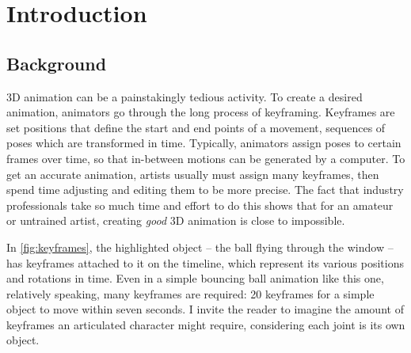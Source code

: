 \chapter{Introduction}\label{chap:intro}
\newcommand{\ignore}[1]{}
\ignore{Write this chapter LAST. Should be 5 to 10 pages. This chapter provides a quick summary of the
essential contents of the research project, principal results and contents of the report. The target
audience is members of the jury who do NOT have time to completely read all 21 reports, as well
academic members of other juries who wish to compare this work to other works.}

\section{Background}
\ignore{This is a generic title. Replace it with an actual title that describes the context of the work.
Short .5 page summary of the technological context of the work and why it is interesting or important}

3D animation can be a painstakingly tedious activity. To create a desired animation, animators go through the long process of keyframing. Keyframes are set positions that define the start and end points of a movement, sequences of poses which are transformed in time. Typically, animators assign poses to certain frames over time, so that in-between motions can be generated by a computer. To get an accurate animation, artists usually must assign many keyframes, then spend time adjusting and editing them to be more precise. The fact that industry professionals take so much time and effort to do this shows that for an amateur or untrained artist, creating \textit{good} 3D animation is close to impossible. 

In \autoref{fig:keyframes}, the highlighted object -- the ball flying through the window -- has keyframes attached to it on the timeline, which represent its various positions and rotations in time. Even in a simple bouncing ball animation like this one, relatively speaking, many keyframes are required: 20 keyframes for a simple object to move within seven seconds. I invite the reader to imagine the amount of keyframes an articulated character might require, considering each joint is its own object.

